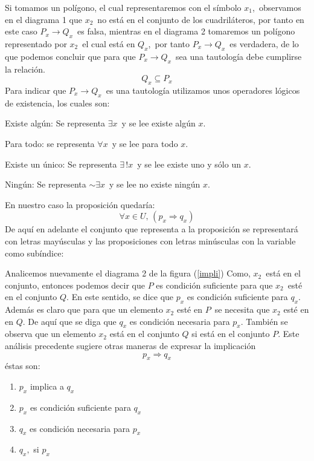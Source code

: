 Si tomamos un polígono, el cual representaremos con el símbolo $x_{1}$,\
observamos en el diagrama 1 que $x_{2}$\ no está en el conjunto
de los cuadriláteros, por tanto en este caso $P_{x}\rightarrow Q_{x}$\ es
falsa, mientras en el diagrama 2 tomaremos un polígono representado
por $x_{2}$\ el cual está en $Q_{x}$,\ por tanto $P_{x}\rightarrow Q_{x}$\ es
verdadera, de lo que podemos concluir que para que $P_{x}\rightarrow Q_{x}$\ sea
una tautología debe cumplirse la relación. 
\[
Q_{x}\subseteq P_{x}
\]
 Para indicar que $P_{x}\rightarrow Q_{x}$\ es una tautología utilizamos
unos operadores lógicos de existencia, los cuales son: \begin{lista} 

\item Existe algún: Se representa $\exists x$\ y se lee existe
algún $x.$ 

\item Para todo: se representa $\forall x$\ y se lee para todo
$x.$ 

\item Existe un único: Se representa $\exists\,!x$\ y se lee existe
uno y sólo un $x.$ 

\item Ningún: Se representa $\sim\exists x$\ y se lee no existe
ningún $x.$ \end{lista} En nuestro caso la proposición quedaría:
\[
\forall x\in U,\,(p_{x}\Longrightarrow q_{x})
\]
 De aquí en adelante el conjunto que representa a la proposición se
representará con letras mayúsculas y las proposiciones con letras
minúsculas con la variable como subíndice: 

Analicemos nuevamente el diagrama 2 de la figura (\ref{impli}) Como,
$x_{2}$\ está en el conjunto, entonces podemos decir que $P$ es
condición suficiente para que $x_{2}$\ esté en el conjunto $Q$.
En este sentido, se dice que $p_{x}$ es condición suficiente para
$q_{x}$. Además es claro que para que un elemento $x_{2}$ esté en
$P$\ se necesita que $x_{2}$ esté en en $Q$. De aquí que se diga
que $q_{x}$ es condición necesaria para $p_{x}.$ También se observa
que un elemento $x_{2}$ está en el conjunto $Q$ si está en el conjunto
$P$. Este análisis precedente sugiere otras maneras de expresar la
implicación 
\[
p_{x}\Longrightarrow q_{x}
\]
 éstas son:
\begin{enumerate}
\item $p_{x}$ implica a $q_{x}$
\item $p_{x}$ es condición suficiente para $q_{x}$
\item $q_{x}$ es condición necesaria para $p_{x}$
\item $q_{x},$ si $p_{x}$ 
\end{enumerate}

